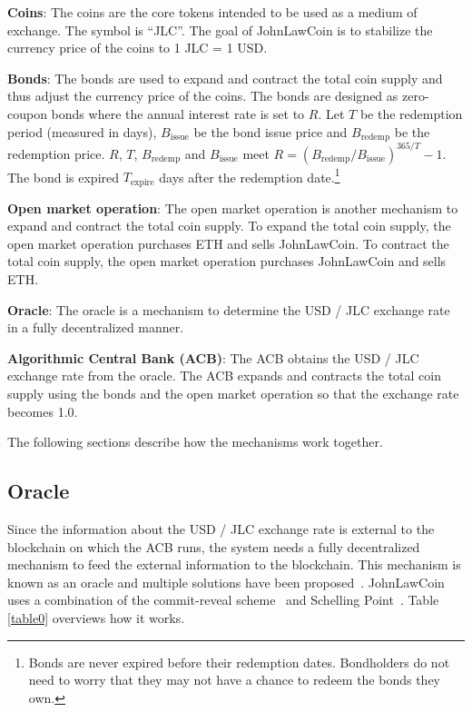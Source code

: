 \documentclass[dvipdfmx,a4paper]{article}
\begin{document}
\begin{description}
\item{\textbf{Coins}}: The coins are the core tokens intended to be used as a medium of exchange. The symbol is ``JLC''. The goal of JohnLawCoin is to stabilize the currency price of the coins to 1 JLC = 1 USD.
\item{\textbf{Bonds}}: The bonds are used to expand and contract the total coin supply and thus adjust the currency price of the coins. The bonds are designed as zero-coupon bonds where the annual interest rate is set to $R$. Let $T$ be the redemption period (measured in days), $B_{\mathrm{issue}}$ be the bond issue price and $B_{\mathrm{redemp}}$ be the redemption price. $R$, $T$, $B_{\mathrm{redemp}}$ and $B_{\mathrm{issue}}$ meet $R=(B_{\mathrm{redemp}}/B_{\mathrm{issue}})^{365/T}-1$. The bond is expired $T_{\mathrm{expire}}$ days after the redemption date.\footnote{Bonds are never expired before their redemption dates. Bondholders do not need to worry that they may not have a chance to redeem the bonds they own.}
\item{\textbf{Open market operation}}: The open market operation is another mechanism to expand and contract the total coin supply. To expand the total coin supply, the open market operation purchases ETH and sells JohnLawCoin. To contract the total coin supply, the open market operation purchases JohnLawCoin and sells ETH.
\item{\textbf{Oracle}}: The oracle is a mechanism to determine the USD / JLC exchange rate in a fully decentralized manner.
\item{\textbf{Algorithmic Central Bank (ACB)}}: The ACB obtains the USD / JLC exchange rate from the oracle. The ACB expands and contracts the total coin supply using the bonds and the open market operation so that the exchange rate becomes 1.0.
\end{description}

The following sections describe how the mechanisms work together.

\subsection{Oracle}

Since the information about the USD / JLC exchange rate is external to the blockchain on which the ACB runs, the system needs a fully decentralized mechanism to feed the external information to the blockchain. This mechanism is known as an oracle and multiple solutions have been proposed~\cite{chainlink,adler2018astraea}. JohnLawCoin uses a combination of the commit-reveal scheme~\cite{wohrer2018design} and Schelling Point~\cite{shellingpoint}. Table \ref{table0} overviews how it works.
\end{document}
